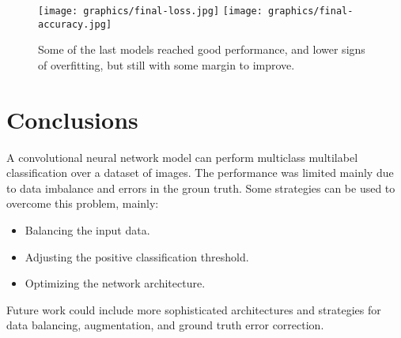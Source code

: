 \documentclass{article}
\begin{document}
\begin{figure}[ht]
  \centering
  \texttt{[image: graphics/final-loss.jpg]}
  \texttt{[image: graphics/final-accuracy.jpg]}
  \caption{Some of the last models reached good performance, and lower signs of overfitting, but still with some margin to improve.}
\end{figure}

\section{Conclusions}
A convolutional neural network model can perform multiclass multilabel classification over a dataset of images.
The performance was limited mainly due to data imbalance and errors in the groun truth.
Some strategies can be used to overcome this problem, mainly:

\begin{itemize}
  \item Balancing the input data.
  \item Adjusting the positive classification threshold.
  \item Optimizing the network architecture.
\end{itemize}

Future work could include more sophisticated architectures and strategies for data balancing, augmentation, and ground truth error correction.
\end{document}
